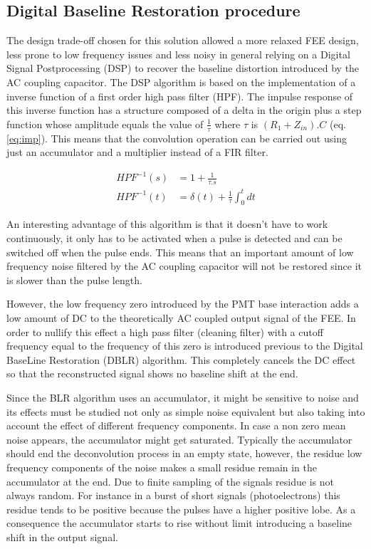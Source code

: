 \documentclass[a4paper, 10pt, oneside, twocolumn, 3p]{elsarticle}
\begin{document}
\subsection{Digital Baseline Restoration procedure}
\label{Digi_base_res}

\par The design trade-off chosen for this solution allowed a more relaxed FEE design, less prone to low frequency issues and less noisy in general relying on a Digital Signal Postprocessing (DSP) to recover the baseline distortion introduced by the AC coupling capacitor. The DSP algorithm is based on the implementation of a inverse function of a first order high pass filter (HPF). The impulse response of this inverse function has a structure composed of a delta in the origin plus a step function whose amplitude equals the value of $\frac{1}{\tau}$ where $\tau$ is $(R_1+Z_{in}).C$ (eq. \ref{eq:imp}). This means that the convolution operation can be carried out using just an accumulator and a multiplier instead of a FIR filter.

\begin{align}
HPF^{-1}(s)&=1+\frac{1}{\tau.s} \\
HPF^{-1}(t)&=\delta(t)+\frac{1}{\tau} \int_{0}^{t} dt
\label{eq:imp}
\end{align}
   
\par An interesting advantage of this algorithm is that it doesn't have to work continuously, it only has to be activated when a pulse is detected and can be switched off when the pulse ends. This means that an important amount of low frequency noise filtered by the AC coupling capacitor will not be restored since it is slower than the pulse length.

\par However, the low frequency zero introduced by the PMT base interaction adds a low amount of DC to the theoretically AC coupled output signal of the FEE. In order to nullify this effect a high pass filter (cleaning filter) with a cutoff frequency equal to the frequency of this zero is introduced previous to the Digital BaseLine Restoration (DBLR) algorithm. This completely cancels the DC effect so that the reconstructed signal shows no baseline shift at the end. 

\par Since the BLR algorithm uses an accumulator, it might be sensitive to noise and its effects must be studied not only as simple noise equivalent but also taking into account the effect of different frequency components. In case a non zero mean noise appears, the accumulator might get saturated. Typically the accumulator should end the deconvolution process in an empty state, however, the residue low frequency components of the noise makes a small residue remain in the accumulator at the end. Due to finite sampling of the signals residue is not always random. For instance in a burst of short signals (photoelectrons) this residue tends to be positive because the pulses have a higher positive lobe. As a consequence the accumulator starts to rise without limit introducing a baseline shift in the output signal.
\end{document}
